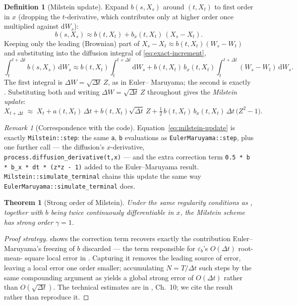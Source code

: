 \documentclass[11pt]{article}
\newcommand{\dd}{\mathrm{d}}
\newcommand{\drift}{a}
\newcommand{\diff}{b}
\theoremstyle{plain}
\newtheorem{theorem}{Theorem}
\theoremstyle{definition}
\newtheorem{definition}{Definition}
\theoremstyle{remark}
\newtheorem{remark}{Remark}
\begin{document}
\begin{definition}[Milstein update]\label{def:milstein}
Expand $\diff(s,X_s)$ around $(t,X_t)$ to first order in $x$ (dropping
the $t$-derivative, which contributes only at higher order once
multiplied against $\dd W_s$):
\[
   \diff(s,X_s) \approx \diff(t,X_t) + \diff_x(t,X_t)\,(X_s-X_t).
\]
Keeping only the leading (Brownian) part of $X_s-X_t\approx
\diff(t,X_t)(W_s-W_t)$ and substituting into the diffusion integral of
\eqref{eq:exact-increment},
\[
   \int_t^{t+\Delta t}\!\diff(s,X_s)\,\dd W_s
     \approx \diff(t,X_t)\int_t^{t+\Delta t}\!\dd W_s
       + \diff(t,X_t)\,\diff_x(t,X_t)\int_t^{t+\Delta t}\!(W_s-W_t)\,\dd W_s.
\]
The first integral is $\Delta W=\sqrt{\Delta t}\,Z$, as in Euler--
Maruyama; the second is exactly . Substituting both and
writing $\Delta W=\sqrt{\Delta t}\,Z$ throughout gives the
\emph{Milstein update}:
\begin{equation}\label{eq:milstein-update}
   X_{t+\Delta t} \;\approx\; X_t + \drift(t,X_t)\,\Delta t
     + \diff(t,X_t)\sqrt{\Delta t}\,Z
     + \tfrac12\,\diff(t,X_t)\,\diff_x(t,X_t)\,\Delta t\,\big(Z^2-1\big).
\end{equation}
\end{definition}

\begin{remark}[Correspondence with the code]
Equation~\eqref{eq:milstein-update} is exactly \texttt{Milstein::step}:
the same \texttt{a}, \texttt{b} evaluations as
\texttt{EulerMaruyama::step}, plus one further call --- the
diffusion's $x$-derivative, \texttt{process.diffusion\_derivative(t,x)}
--- and the extra correction term
\texttt{0.5 * b * b\_x * dt * (z*z - 1)} added to the Euler--Maruyama
result. \texttt{Milstein::simulate\_terminal} chains this update the
same way \texttt{EulerMaruyama::simulate\_terminal} does.
\end{remark}

\begin{theorem}[Strong order of Milstein]\label{thm:milstein-order}
Under the same regularity conditions as , together
with $\diff$ being twice continuously differentiable in $x$, the
Milstein scheme has strong order $\gamma=1$.
\end{theorem}

\begin{proof}[Proof strategy]
 shows the correction term recovers exactly the
contribution Euler--Maruyama's freezing of $\diff$ discarded --- the
term responsible for $\varepsilon_{\diff}$'s $O(\Delta t)$ root-mean-
square local error in . Capturing it removes
the leading source of error, leaving a local error one order smaller;
accumulating $N=T/\Delta t$ such steps by the same
compounding argument as  yields a global strong
error of $O(\Delta t)$ rather than $O(\sqrt{\Delta t})$. The technical
estimates are in , Ch.~10; we cite the result
rather than reproduce it.
\end{proof}
\end{document}
